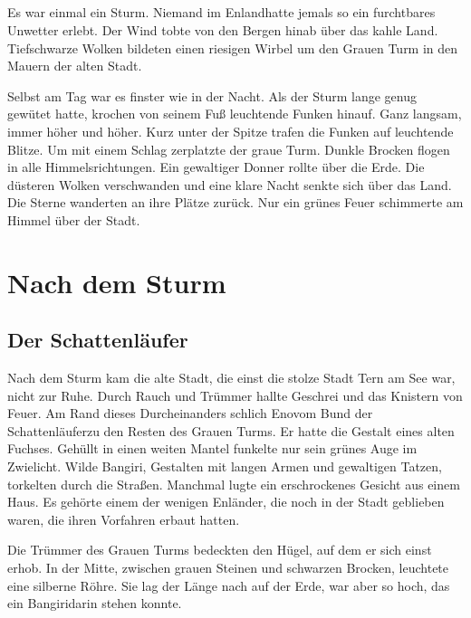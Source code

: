\documentclass[12pt,a4paper,onecolumn,twoside,ngerman]{book}
\newcommand{\Tern}{Tern }
\newcommand{\Bangiri}{Bangiri}
\newcommand{\Enland}{Enland}
\newcommand{\Schattenjager}{Schattenläufer}
\newcommand{\Eno}{Eno}
\begin{document}
  
  


\paragraph{}
Es war einmal ein Sturm.
Niemand im \Enland hatte jemals so ein furchtbares Unwetter erlebt. Der Wind tobte von den Bergen hinab über das kahle Land. Tiefschwarze Wolken bildeten einen riesigen Wirbel um den Grauen Turm in den Mauern der alten Stadt. 

Selbst am Tag war es finster wie in der Nacht. Als der Sturm lange genug gewütet hatte, krochen von seinem Fuß leuchtende Funken hinauf. Ganz langsam, immer höher und höher. Kurz unter der Spitze trafen die Funken auf leuchtende Blitze. Um mit einem Schlag zerplatzte der graue Turm. Dunkle Brocken flogen in alle Himmelsrichtungen. Ein gewaltiger Donner rollte über die Erde. Die düsteren Wolken verschwanden und eine klare Nacht senkte sich über das Land. Die Sterne wanderten an ihre Plätze zurück. Nur ein grünes Feuer schimmerte am Himmel über der Stadt.

\chapter{Nach dem Sturm}
\section{Der \Schattenjager}
Nach dem Sturm kam die alte Stadt, die einst die stolze Stadt \Tern am See war, nicht zur Ruhe. 
Durch Rauch und Trümmer hallte Geschrei und das Knistern von Feuer. Am Rand dieses Durcheinanders schlich \Eno vom Bund der \Schattenjager zu den Resten des Grauen Turms. Er hatte die Gestalt eines alten Fuchses. Gehüllt in einen weiten Mantel funkelte nur sein grünes Auge im Zwielicht. Wilde \Bangiri, Gestalten mit langen Armen und gewaltigen Tatzen, torkelten durch die Straßen. Manchmal lugte ein erschrockenes Gesicht aus einem Haus. Es gehörte einem der wenigen Enländer, die noch in der Stadt geblieben waren, die ihren Vorfahren erbaut hatten.

Die Trümmer des Grauen Turms bedeckten den Hügel, auf dem er sich einst erhob. In der Mitte, zwischen grauen Steinen und schwarzen Brocken, leuchtete eine silberne Röhre. Sie lag der Länge nach auf der Erde, war aber so hoch, das ein \Bangiri darin stehen konnte. 
\end{document}
